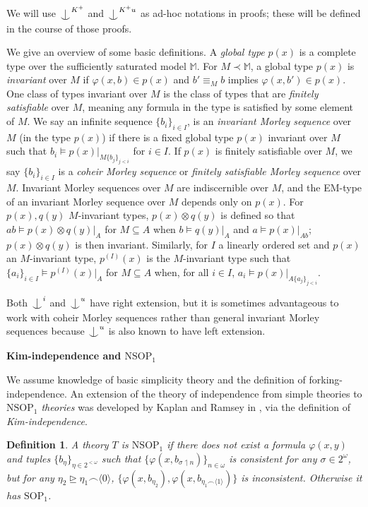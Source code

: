 \documentclass[12pt]{amsart}
\newtheorem{definition}{Definition}[section]
\theoremstyle{definition}
\def\Ind#1#2{#1\setbox0=\hbox{$#1x$}\kern\wd0\hbox to 0pt{\hss$#1\mid$\hss}
\lower.9\ht0\hbox to 0pt{\hss$#1\smile$\hss}\kern\wd0}
\def\ind{\mathop{\mathpalette\Ind{}}}
\begin{document}
We will use $\ind^{K^{+}}$ and $\ind^{K^{+}u}$ as ad-hoc notations in proofs; these will be defined in the course of those proofs.

We give an overview of some basic definitions. A \textit{global type} $p(x)$ is a complete type over the sufficiently saturated model $\mathbb{M}$. For $M \prec \mathbb{M}$, a global type $p(x)$ is \textit{invariant} over $M$ if $\varphi(x, b) \in p(x)$ and $b' \equiv_{M} b$ implies $\varphi(x, b') \in p(x)$. One class of types invariant over $M$ is the class of types that are \textit{finitely satisfiable} over $M$, meaning any formula in the type is satisfied by some element of $M$. We say an infinite sequence $\{b_{i}\}_{i \in I}$, is an \textit{invariant Morley sequence} over $M$ (in the type $p(x)$) if there is a fixed global type $p(x)$ invariant over $M$ such that $b_{i} \models p(x)|_{M\{b_{j}\}_{j < i}}$ for $i \in I$. If $p(x)$ is finitely satisfiable over $M$, we say $\{b_{i}\}_{i \in I}$ is a \textit{coheir Morley sequence} or \textit{finitely satisfiable Morley sequence} over $M$. Invariant Morley sequences over $M$ are indiscernible over $M$, and the  EM-type of an invariant Morley sequence over $M$ depends only on $p(x)$. For $p(x), q(y)$ $M$-invariant types, $p(x) \otimes q(y)$ is defined so that $ab \models p(x)\otimes q(y)|_{A}$ for $M \subseteq A$ when $b \models q(y)|_A$ and $a \models p(x)|_{Ab}$; $p(x) \otimes q(y)$ is then invariant. Similarly, for $I$ a linearly ordered set and $p(x)$ an $M$-invariant type, $p^{(I)}(x)$ is the $M$-invariant type such that $\{a_{i}\}_{i \in I} \models p^{(I)}(x)|_{A}$ for $M \subseteq A$ when, for all $i \in I$, $a_{i} \models p(x)|_{A\{a_{j}\}_{j < i}}$.

Both $\ind^{i}$ and $\ind^{u}$ have right extension, but it is sometimes advantageous to work with coheir Morley sequences rather than general invariant Morley sequences because $\ind^{u}$ is also known to have left extension.

\textbf{Kim-independence and $\mathrm{NSOP}_{1}$}

We assume knowledge of basic simplicity theory and the definition of forking-independence. An extension of the theory of independence from simple theories to \textit{$\mathrm{NSOP}_{1}$ theories} was developed by Kaplan and Ramsey in \cite{KR17}, via the definition of \textit{Kim-independence}.


\begin{definition}\label{3-nsop1}
A theory $T$ is $\mathrm{NSOP}_{1}$ if there does not exist a formula $\varphi(x, y)$ and tuples $\{b_{\eta}\}_{\eta \in 2^{<\omega}}$ such that $\{\varphi(x, b_{\sigma \upharpoonleft n})\}_{n \in \omega}$ is consistent for any $\sigma \in 2^{\omega}$, but for any $\eta_{2} \unrhd \eta_{1} \smallfrown \langle 0\rangle$, $\{\varphi(x, b_{\eta_{2}}), \varphi(x, b_{\eta_{1} \smallfrown \langle 1\rangle})\}$ is inconsistent. Otherwise it has $\mathrm{SOP}_{1}$.
\end{definition}
\end{document}
